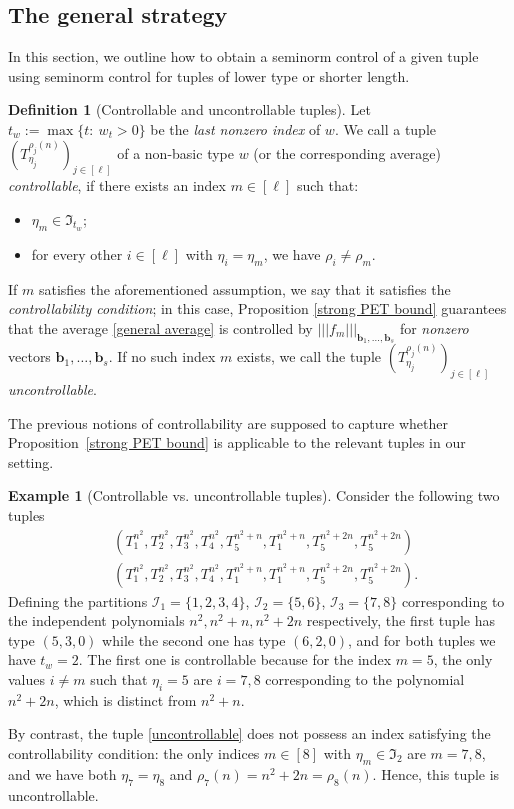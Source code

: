 \documentclass[11pt]{amsart}
\theoremstyle{definition}
\newtheorem*{definition}{Definition}
\newtheorem{example}{Example}
\newcommand{\CI}{{\mathcal I}}
\newcommand{\FI}{{\mathfrak I}}
\renewcommand{\b}{{\textbf{b}}}
\newcommand{\nnorm}[1]{\lvert\!|\!| #1|\!|\!\rvert}
\newcommand{\brac}[1]{\mathopen{}\left( #1 \mathclose{}\right)}
\begin{document}
\subsection{The general strategy}\label{SS: strategy}
In this section, we outline how to obtain a seminorm control of a given tuple using seminorm control for tuples of lower type or shorter length.
\begin{definition}[Controllable and uncontrollable tuples] Let $t_w := \max\{t:\ w_t>0\}$ be the \textit{last nonzero index} of $w$. We call a tuple $\brac{T_{\eta_j}^{\rho_j(n)}}_{j\in[\ell]}$ of a non-basic type $w$ (or the corresponding average) \textit{controllable}, if there exists an index $m\in[\ell]$ such that:
\begin{itemize}
    \item $\eta_m\in\FI_{t_w}$;
    \item for every other $i\in[\ell]$ with $\eta_i=\eta_m$, we have $\rho_i\neq \rho_m$.
\end{itemize}
If $m$ satisfies the aforementioned assumption, we say that it satisfies the \textit{controllability condition}; in this case, Proposition \ref{strong PET bound} guarantees that the average \eqref{general average} is controlled by $\nnorm{f_m}_{\b_1, \ldots, \b_{s}}$ for \emph{nonzero} vectors $\b_1, \ldots, \b_{s}$. If no such index $m$ exists, we call the tuple $\brac{T_{\eta_j}^{\rho_j(n)}}_{j\in[\ell]}$ \textit{uncontrollable}.
\end{definition}
The previous notions of controllability are supposed to capture whether Proposition~\ref{strong PET bound} is applicable to the relevant tuples in our setting.
\begin{example}[Controllable vs. uncontrollable tuples]\label{Ex: controllable}
Consider the following two tuples
\begin{align}
    \label{controllable} &\brac{T_1^{n^2}, T_2^{n^2}, T_3^{n^2}, T_4^{n^2}, T_5^{n^2+n}, T_1^{n^2+n}, T_5^{n^2+2n}, T_5^{n^2+2n}}\\
    \label{uncontrollable} &\brac{T_1^{n^2}, T_2^{n^2}, T_3^{n^2}, T_4^{n^2}, T_1^{n^2+n}, T_1^{n^2+n}, T_5^{n^2+2n}, T_5^{n^2+2n}}.
\end{align}
Defining the partitions $\CI_1 = \{1, 2, 3, 4\}$, $\CI_2 = \{5, 6\}$, $\CI_3 = \{7, 8\}$ corresponding to the independent polynomials $n^2, n^2+n, n^2+2n$ respectively, the first tuple has type $(5, 3, 0)$ while the second one has type $(6, 2, 0)$, and for both tuples  we have $t_w=2$. The  first one is controllable because for the index  $m = 5$, the only values $i\neq m$ such that $\eta_i = 5$ are $i=7,8$ corresponding to the polynomial $n^2+2n$, which is distinct from $n^2+n$.

By contrast, the tuple \eqref{uncontrollable} does not possess an index satisfying the controllability condition: the only indices $m\in[8]$ with $\eta_m\in\FI_2$ are $m=7,8$, and we have both $\eta_7 = \eta_8$ and $\rho_7(n) = n^2+2n = \rho_8(n)$. Hence, this tuple is uncontrollable.
\end{example}
\end{document}
